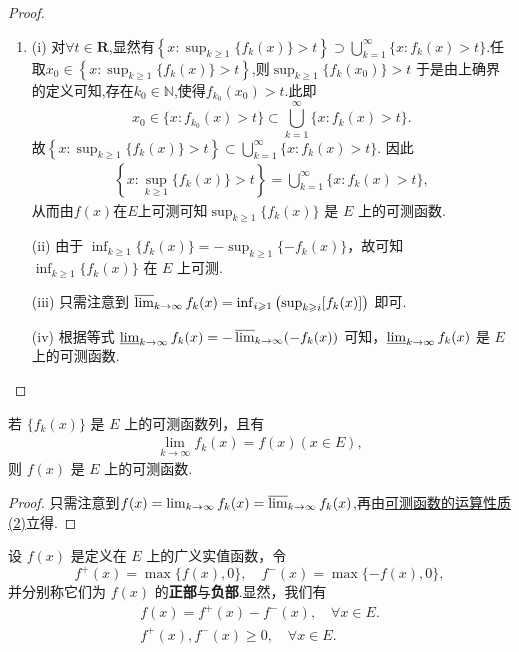 \documentclass[../../main.tex]{subfiles}
\begin{document}
\begin{proof}
\begin{enumerate}[(1)]
\item (i) 对$\forall t \in \mathbf{R}$,显然有$\left\{x: \sup_{k \geqslant 1}\{f_k(x)\} > t\right\} \supset \bigcup_{k = 1}^{\infty}\{x: f_k(x) > t\}.$任取$x_0\in \left\{x: \sup_{k \geqslant 1}\{f_k(x)\} > t\right\}$,则$ \sup_{k \geqslant 1}\{f_k(x_0)\} > t$
于是由上确界的定义可知,存在$k_0\in \mathbb{N}$,使得$f_{k_0}(x_0)>t$.此即$$x_0\in \{x: f_{k_0}(x) > t\}\subset \bigcup_{k = 1}^{\infty}\{x: f_k(x) > t\}.$$
故$\left\{x: \sup_{k \geqslant 1}\{f_k(x)\} > t\right\} \subset \bigcup_{k = 1}^{\infty}\{x: f_k(x) > t\}.$
因此
\begin{align*}
\left\{x: \sup_{k \geqslant 1}\{f_k(x)\} > t\right\} = \bigcup_{k = 1}^{\infty}\{x: f_k(x) > t\},
\end{align*}
从而由$f(x)$在$E$上可测可知\(\sup_{k \geqslant 1}\{f_k(x)\}\) 是 \(E\) 上的可测函数.

(ii) 由于 \(\inf_{k \geqslant 1}\{f_k(x)\} = -\sup_{k \geqslant 1}\{-f_k(x)\}\)，故可知 \(\inf_{k \geqslant 1}\{f_k(x)\}\) 在 \(E\) 上可测.

(iii) 只需注意到 \(\varlimsup_{k \to \infty} f_k(x) = \inf_{i \geqslant 1}\left(\sup_{k \geqslant i}[f_k(x)]\right)\) 即可.

(iv) 根据等式 \(\varliminf_{k \to \infty} f_k(x) = -\varlimsup_{k \to \infty}(-f_k(x))\) 可知，\(\varliminf_{k \to \infty} f_k(x)\) 是 \(E\) 上的可测函数. 
\end{enumerate}
\end{proof}

\begin{corollary}\label{corollary:可测函数列的极限也可测}
若 \(\{f_k(x)\}\) 是 \(E\) 上的可测函数列，且有
\begin{align*}
\lim_{k \to \infty}f_k(x) = f(x) (x \in E),
\end{align*}
则 \(f(x)\) 是 \(E\) 上的可测函数. 
\end{corollary}
\begin{proof}
只需注意到$f(x)=\lim_{k\to \infty}f_k(x)=\varlimsup_{k\to \infty}f_k(x)$,再由\hyperref[theorem:可测函数的运算性质]{可测函数的运算性质(2)}立得.
\end{proof}

\begin{definition}[函数的正部和负部]
设 \(f(x)\) 是定义在 \(E\) 上的广义实值函数，令
\[
f^+(x) = \max\{f(x),0\}, \quad f^-(x) = \max\{-f(x),0\},
\]
并分别称它们为 \(f(x)\) 的\textbf{正部}与\textbf{负部}.显然，我们有
\begin{gather*}
f(x) = f^+(x) - f^-(x),\quad \forall x\in E.
\\
f^+(x),f^-(x)\geqslant 0,\quad \forall x\in E.
\end{gather*}
\end{definition}
\end{document}
